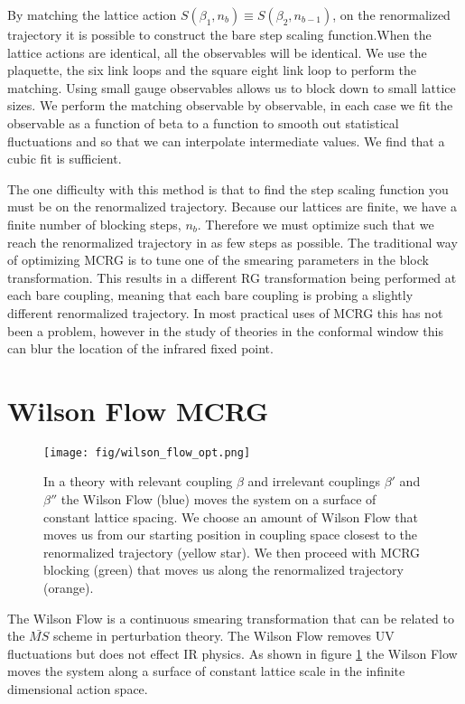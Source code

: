 \documentclass{PoS}
\begin{document}
By matching the lattice action $S(\beta_1,n_b) \equiv S(\beta_2,n_{b-1})$, on the renormalized trajectory it is possible to construct the bare step scaling function.When the lattice actions are identical, all the observables will be identical.
We use the plaquette, the six link loops and the square eight link loop to perform the matching.
Using small gauge observables allows us to block down to small lattice sizes.
We perform the matching observable by observable, in each case we fit the observable as a function of beta to a function to smooth out statistical fluctuations and so that we can interpolate intermediate values.
We find that a cubic fit is sufficient.

The one difficulty with this method is that to find the step scaling function you must be on the renormalized trajectory.
Because our lattices are finite, we have a finite number of blocking steps, $n_b$.
Therefore we must optimize such that we reach the renormalized trajectory in as few steps as possible.
The traditional way of optimizing MCRG is to tune one of the smearing parameters in the block transformation.
This results in a different RG transformation being performed at each bare coupling, meaning that each bare coupling is probing a slightly different renormalized trajectory.
In most practical uses of MCRG this has not been a problem, however in the study of theories in the conformal window this can blur the location of the infrared fixed point.

\section{Wilson Flow MCRG}
\label{sec:wmcrg}
\begin{figure}[th]
  \centering
  \texttt{[image: fig/wilson\_flow\_opt.png]}
  \caption{In a theory with relevant coupling $\beta$ and irrelevant couplings $\beta'$ and $\beta''$ the Wilson Flow (blue) moves the system on a surface of constant lattice spacing.  We choose an amount of Wilson Flow that moves us from our starting position in coupling space closest to the renormalized trajectory (yellow star).  We then proceed with MCRG blocking (green) that moves us along the renormalized trajectory (orange).}
  \label{fig:wflow_opt}
\end{figure}

The Wilson Flow is a continuous smearing transformation that can be related to the $\bar{MS}$ scheme in perturbation theory.
The Wilson Flow removes UV fluctuations but does not effect IR physics.
As shown in figure \ref{fig:wflow_opt} the Wilson Flow moves the system along a surface of constant lattice scale in the infinite dimensional action space.
\end{document}
